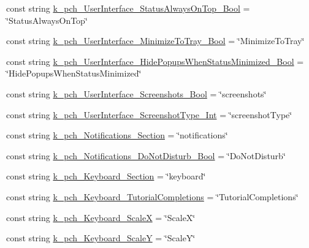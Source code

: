 \begin{DoxyCompactItemize}
\item 
const string \mbox{\hyperlink{class_valve_1_1_v_r_1_1_open_v_r_a2f6da6488796640201c657775ac8ffb5}{k\+\_\+pch\+\_\+\+User\+Interface\+\_\+\+Status\+Always\+On\+Top\+\_\+\+Bool}} = \char`\"{}Status\+Always\+On\+Top\char`\"{}
\item 
const string \mbox{\hyperlink{class_valve_1_1_v_r_1_1_open_v_r_ab45226927c0b6d662b1901345a12eb3f}{k\+\_\+pch\+\_\+\+User\+Interface\+\_\+\+Minimize\+To\+Tray\+\_\+\+Bool}} = \char`\"{}Minimize\+To\+Tray\char`\"{}
\item 
const string \mbox{\hyperlink{class_valve_1_1_v_r_1_1_open_v_r_a4d74fb37d27e1758cd2b409baa98fe17}{k\+\_\+pch\+\_\+\+User\+Interface\+\_\+\+Hide\+Popups\+When\+Status\+Minimized\+\_\+\+Bool}} = \char`\"{}Hide\+Popups\+When\+Status\+Minimized\char`\"{}
\item 
const string \mbox{\hyperlink{class_valve_1_1_v_r_1_1_open_v_r_ad97eedb848b758c812c7d8e480636508}{k\+\_\+pch\+\_\+\+User\+Interface\+\_\+\+Screenshots\+\_\+\+Bool}} = \char`\"{}screenshots\char`\"{}
\item 
const string \mbox{\hyperlink{class_valve_1_1_v_r_1_1_open_v_r_a482e63e42af3a66b533b04c8a970745b}{k\+\_\+pch\+\_\+\+User\+Interface\+\_\+\+Screenshot\+Type\+\_\+\+Int}} = \char`\"{}screenshot\+Type\char`\"{}
\item 
const string \mbox{\hyperlink{class_valve_1_1_v_r_1_1_open_v_r_a84b540de55c9c454ecd2f02a7f72a2b3}{k\+\_\+pch\+\_\+\+Notifications\+\_\+\+Section}} = \char`\"{}notifications\char`\"{}
\item 
const string \mbox{\hyperlink{class_valve_1_1_v_r_1_1_open_v_r_a0fd030d275cfa4d5feb4a36a4820ae39}{k\+\_\+pch\+\_\+\+Notifications\+\_\+\+Do\+Not\+Disturb\+\_\+\+Bool}} = \char`\"{}Do\+Not\+Disturb\char`\"{}
\item 
const string \mbox{\hyperlink{class_valve_1_1_v_r_1_1_open_v_r_aa7e42c991319f9f5d9522965a9915b4c}{k\+\_\+pch\+\_\+\+Keyboard\+\_\+\+Section}} = \char`\"{}keyboard\char`\"{}
\item 
const string \mbox{\hyperlink{class_valve_1_1_v_r_1_1_open_v_r_a1e88453e1532cf5d034d22aa02391819}{k\+\_\+pch\+\_\+\+Keyboard\+\_\+\+Tutorial\+Completions}} = \char`\"{}Tutorial\+Completions\char`\"{}
\item 
const string \mbox{\hyperlink{class_valve_1_1_v_r_1_1_open_v_r_a69094bd3388e2fc35633980eb67f432a}{k\+\_\+pch\+\_\+\+Keyboard\+\_\+\+ScaleX}} = \char`\"{}ScaleX\char`\"{}
\item 
const string \mbox{\hyperlink{class_valve_1_1_v_r_1_1_open_v_r_aacd083ef9e006ec841d39a089774e5e9}{k\+\_\+pch\+\_\+\+Keyboard\+\_\+\+ScaleY}} = \char`\"{}ScaleY\char`\"{}

\end{DoxyCompactItemize}
